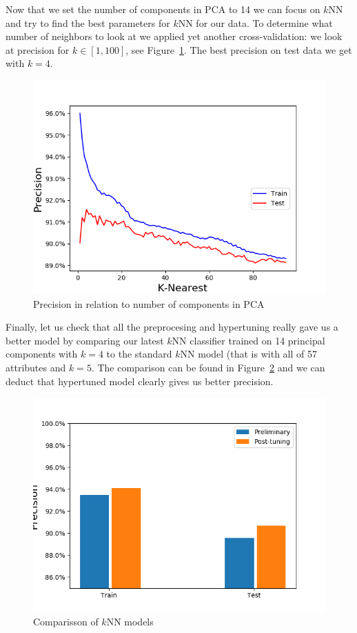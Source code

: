 \documentclass[11pt,a4paper]{article}
\begin{document}
Now that we set the number of components in PCA to 14 we can focus on $k$NN and try to find the best parameters for $k$NN for our data. To determine what number of neighbors to look at we applied yet another cross-validation: we look at precision for $k\in [1,100]$, see Figure~\ref{fig:Hypertune_kNearest}. The best precision on test data we get with $k=4$.
\begin{figure}[ht!]
\centering
\includegraphics[scale=0.60]{Hypertune_kNearest_recall.png}
\caption{Precision in relation to number of components in PCA}
\label{fig:Hypertune_kNearest}
\end{figure}

Finally, let us check that all the preprocesing and hypertuning really gave us a better model by comparing our latest $k$NN classifier trained on 14 principal components with $k=4$ to the standard $k$NN model (that is with all of 57 attributes and $k=5$. The comparison can be found in Figure~\ref{fig:kNN_model_comparison} and we can deduct that hypertuned model clearly gives us better precision.
\begin{figure}[ht!]
\centering
\includegraphics[scale=0.60]{kNN_model_comparison_precision.png}
\caption{Comparisson of $k$NN models}
\label{fig:kNN_model_comparison}
\end{figure}
\end{document}
